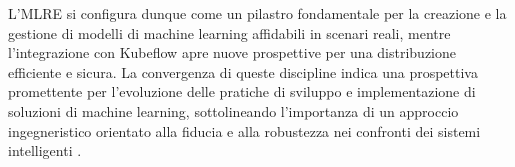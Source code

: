 L'MLRE si configura dunque come un pilastro fondamentale per la creazione e la gestione di modelli di machine learning affidabili in scenari reali, mentre l'integrazione con Kubeflow apre nuove prospettive per una distribuzione efficiente e sicura. La convergenza di queste discipline indica una prospettiva promettente per l'evoluzione delle pratiche di sviluppo e implementazione di soluzioni di machine learning, sottolineando l'importanza di un approccio ingegneristico orientato alla fiducia e alla robustezza nei confronti dei sistemi intelligenti \cite{MLRE_Kubeflow_integration}.